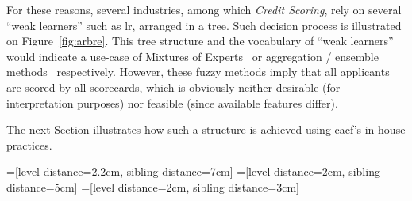 For these reasons, several industries, among which \textit{Credit Scoring}, rely on several ``weak learners'' such as \gls{lr}, arranged in a tree. Such decision process is illustrated on Figure~\ref{fig:arbre}. This tree structure and the vocabulary of ``weak learners'' would indicate a use-case of Mixtures of Experts~\cite{jordan1994hierarchical} or aggregation / ensemble methods~\cite{opitz1999popular} respectively. However, these fuzzy methods imply that all applicants are scored by all scorecards, which is obviously neither desirable (for interpretation purposes) nor feasible (since available features differ).

The next Section illustrates how such a structure is achieved using \gls{cacf}'s in-house practices.

=[level distance=2.2cm, sibling distance=7cm]
=[level distance=2cm, sibling distance=5cm]
=[level distance=2cm, sibling distance=3cm]

